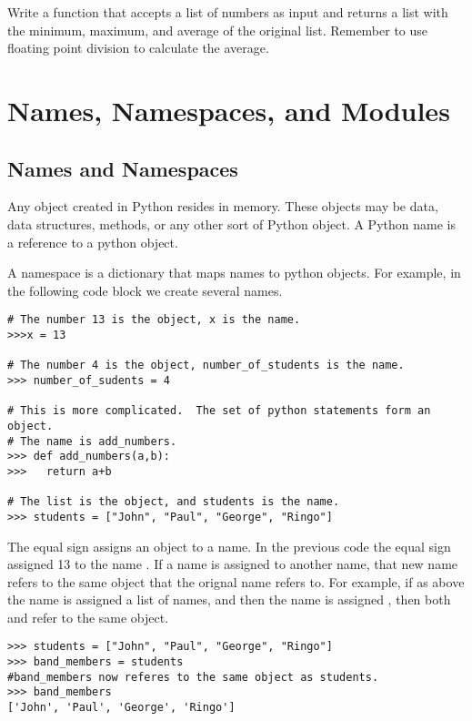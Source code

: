 \begin{problem}
Write a function that accepts a list of numbers as input and returns a list with the minimum, maximum, and average of the original list.
Remember to use floating point division to calculate the average.
\end{problem}

\section*{Names, Namespaces, and Modules}

\subsection*{Names and Namespaces}
Any object created in Python resides in memory.
These objects may be data, data structures, methods, or any other sort of Python object.
A Python name is a reference to a python object.

A namespace is a dictionary that maps names to python objects.
For example, in the following code block we create several names.

\begin{lstlisting}
# The number 13 is the object, x is the name.
>>>x = 13

# The number 4 is the object, number_of_students is the name.
>>> number_of_sudents = 4

# This is more complicated.  The set of python statements form an object.  
# The name is add_numbers.
>>> def add_numbers(a,b):
>>>   return a+b

# The list is the object, and students is the name.
>>> students = ["John", "Paul", "George", "Ringo"]
\end{lstlisting}

The equal sign assigns an object to a name.
In the previous code the equal sign assigned 13 to the name .
If a name is assigned to another name, that new name refers to the same object that the orignal name refers to.
For example, if as above the name  is assigned a list of names, and then the name  is assigned , then both  and  refer to the same object.

\begin{lstlisting}
>>> students = ["John", "Paul", "George", "Ringo"]
>>> band_members = students
#band_members now referes to the same object as students.
>>> band_members
['John', 'Paul', 'George', 'Ringo']
\end{lstlisting}


